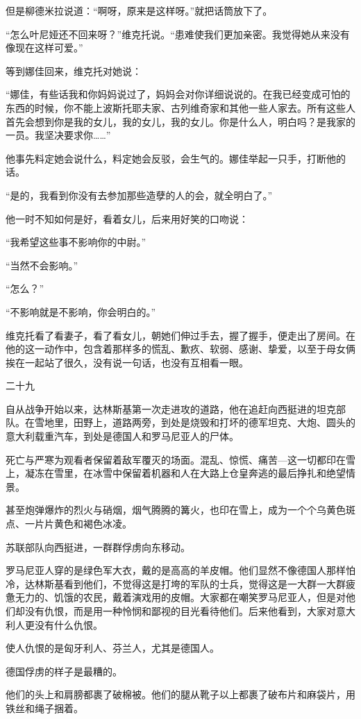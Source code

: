 但是柳德米拉说道：“啊呀，原来是这样呀。”就把话筒放下了。

“怎么叶尼娅还不回来呀？”维克托说。“患难使我们更加亲密。我觉得她从来没有像现在这样可爱。”

等到娜佳回来，维克托对她说：

“娜佳，有些话我和你妈妈说过了，妈妈会对你详细说说的。在我已经变成可怕的东西的时候，你不能上波斯托耶夫家、古列维奇家和其他一些人家去。所有这些人首先会想到你是我的女儿，我的女儿，我的女儿。你是什么人，明白吗？是我家的一员。我坚决要求你……”

他事先料定她会说什么，料定她会反驳，会生气的。娜佳举起一只手，打断他的话。

“是的，我看到你没有去参加那些造孽的人的会，就全明白了。”

他一时不知如何是好，看着女儿，后来用好笑的口吻说：

“我希望这些事不影响你的中尉。”

“当然不会影响。”

“怎么？”

“不影响就是不影响，你会明白的。”

维克托看了看妻子，看了看女儿，朝她们伸过手去，握了握手，便走出了房间。在他的这一动作中，包含着那样多的慌乱、歉疚、软弱、感谢、挚爱，以至于母女俩挨在一起站了很久，没有说一句话，也没有互相看一眼。

二十九

自从战争开始以来，达林斯基第一次走进攻的道路，他在追赶向西挺进的坦克部队。在雪地里，田野上，道路两旁，到处是烧毁和打坏的德军坦克、大炮、圆头的意大利载重汽车，到处是德国人和罗马尼亚人的尸体。

死亡与严寒为观看者保留着敌军覆灭的场面。混乱、惊慌、痛苦—这一切都印在雪上，凝冻在雪里，在冰雪中保留着机器和人在大路上仓皇奔逃的最后挣扎和绝望情景。

甚至炮弹爆炸的烈火与硝烟，烟气腾腾的篝火，也印在雪上，成为一个个乌黄色斑点、一片片黄色和褐色冰凌。

苏联部队向西挺进，一群群俘虏向东移动。

罗马尼亚人穿的是绿色军大衣，戴的是高高的羊皮帽。他们显然不像德国人那样怕冷，达林斯基看到他们，不觉得这是打垮的军队的士兵，觉得这是一大群一大群疲惫无力的、饥饿的农民，戴着演戏用的皮帽。大家都在嘲笑罗马尼亚人，但是对他们却没有仇恨，而是用一种怜悯和鄙视的目光看待他们。后来他看到，大家对意大利人更没有什么仇恨。

使人仇恨的是匈牙利人、芬兰人，尤其是德国人。

德国俘虏的样子是最糟的。

他们的头上和肩膀都裹了破棉被。他们的腿从靴子以上都裹了破布片和麻袋片，用铁丝和绳子捆着。

